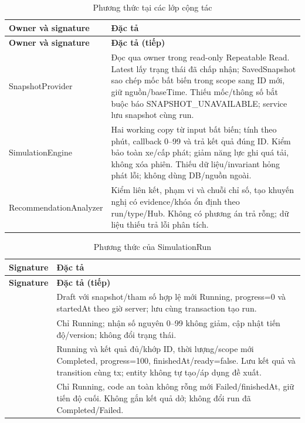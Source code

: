 \begin{longtable}{|L{58mm}|L{81mm}|}
\caption{Phương thức tại các lớp cộng tác}\\\hline
\textbf{Owner và signature} & \textbf{Đặc tả}\\\hline
\endfirsthead
\hline\textbf{Owner và signature} & \textbf{Đặc tả (tiếp)}\\\hline\endhead
SnapshotProvider\par{} &
Đọc qua owner trong read-only Repeatable Read. Latest lấy trạng thái đã chấp nhận; SavedSnapshot sao chép mốc bất biến trong scope sang ID mới, giữ nguồn/baseTime. Thiếu mốc/thông số bắt buộc báo SNAPSHOT\_UNAVAILABLE; service lưu snapshot cùng run.\\\hline
SimulationEngine\par{} &
Hai working copy từ input bất biến; tính theo phút, callback 0--99 và trả kết quả đúng ID. Kiểm bảo toàn xe/cấp phát; giảm năng lực ghi quá tải, không xóa phiên. Thiếu dữ liệu/invariant hỏng phát lỗi; không dùng DB/nguồn ngoài.\\\hline
RecommendationAnalyzer\par{} &
Kiểm liên kết, phạm vi và chuỗi chỉ số, tạo khuyến nghị có evidence/khóa ổn định theo run/type/Hub. Không có phương án trả rỗng; dữ liệu thiếu trả lỗi phân tích.\\\hline
\end{longtable}

\begin{longtable}{|L{58mm}|L{81mm}|}
\caption{Phương thức của SimulationRun}\\\hline
\textbf{Signature} & \textbf{Đặc tả}\\\hline
\endfirsthead
\hline\textbf{Signature} & \textbf{Đặc tả (tiếp)}\\\hline\endhead
{} &
Draft với snapshot/tham số hợp lệ mới Running, progress=0 và startedAt theo giờ server; lưu cùng transaction tạo run.\\\hline
{} &
Chỉ Running; nhận số nguyên 0--99 không giảm, cập nhật tiến độ/version; không đổi trạng thái.\\\hline
{} &
Running và kết quả đủ/khớp ID, thời lượng/scope mới Completed, progress=100, finishedAt/ready=false. Lưu kết quả và transition cùng tx; entity không tự tạo/áp dụng đề xuất.\\\hline
{} &
Chỉ Running, code an toàn không rỗng mới Failed/finishedAt, giữ tiến độ cuối. Không gắn kết quả dở; không đổi run đã Completed/Failed.\\\hline
\end{longtable}
